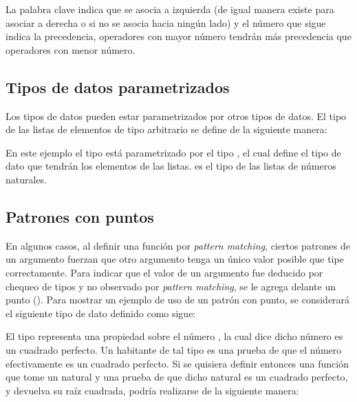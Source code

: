 La palabra clave  indica que se asocia a izquierda (de igual manera existe  para asociar a derecha o  si no se asocia hacia ningún lado) y el número que sigue indica la precedencia, operadores con mayor número tendrán más precedencia que operadores con menor número.

\subsection{Tipos de datos parametrizados}\label{tipos:parametrized}

Los tipos de datos pueden estar parametrizados por otros tipos de datos. El tipo de las listas de elementos de tipo arbitrario se define de la siguiente manera:


En este ejemplo el tipo  está parametrizado por el tipo , el cual define el tipo de dato que tendrán los elementos de las listas.   es el tipo de las listas de números naturales. 


\subsection{Patrones con puntos}\label{tipos:puntos}

En algunos casos, al definir una función por \textit{pattern matching}, ciertos patrones de un argumento fuerzan que otro argumento tenga un único valor posible que tipe correctamente. Para indicar que el valor de un argumento fue deducido por chequeo de tipos y no observado por \textit{pattern matching},  se le agrega delante un punto (). Para mostrar un ejemplo de uso de un patrón con punto, se considerará el siguiente tipo de dato  definido como sigue:


El tipo   representa una propiedad sobre el número , la cual dice
dicho número es un cuadrado perfecto. Un habitante de tal tipo es una prueba de que el número  efectivamente es un cuadrado perfecto. Si se quisiera definir entonces una función  que tome un natural y una prueba de que dicho natural es un cuadrado perfecto, y devuelva su raíz cuadrada, podría realizarse de la siguiente manera:

